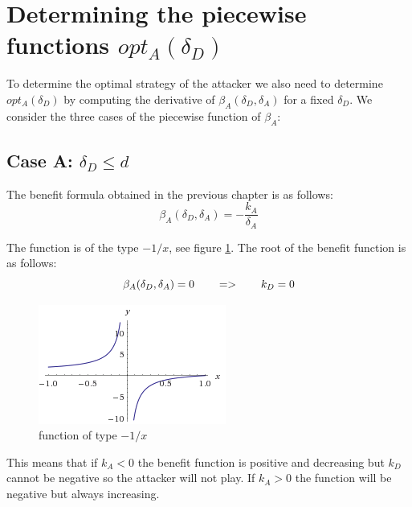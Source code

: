 \section{Determining the piecewise functions $opt_{A}(\delta_{D})$}
To determine the optimal strategy of the attacker we also need to determine $opt_{A}(\delta_{D})$ by computing the derivative of $\beta_{A}(\delta_{D},\delta_{A})$ for a fixed $\delta_{D}$. We consider the three cases of the piecewise function of $\beta_{A}$: \\


\subsection*{Case A: $\delta_{D} \leq d$}

The benefit formula obtained in the previous chapter is as follows:
\begin{equation}
\beta_{A}(\delta_{D},\delta_{A}) =  - \dfrac{k_{A}}{\delta_{A}}
\end{equation}


The function is of the type $-1/x$, see figure \ref{1xx}. The root of the benefit function is as follows:
\begin{equation}
\beta_{A}(\delta_{D},\delta_{A}) =0  ~~~~~~ =>~~~~~~k_{D} = 0 \\
\end{equation}


\begin{figure}[hbtp]
\centering
\includegraphics[scale=1]{Images/1x.png}
\caption{function of type $-1/x$}
\label{1xx}
\end{figure}

This means that if $k_{A} < 0$ the benefit function is positive and decreasing but $k_{D}$ cannot be negative so the attacker will not play. If $k_{A} > 0$ the function will be negative but always increasing.



